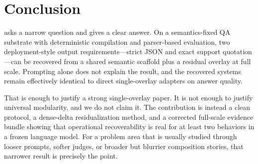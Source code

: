 
\section{Conclusion}

\method{} asks a narrow question and gives a clear answer. On a semantics-fixed QA substrate with deterministic compilation and parser-based evaluation, two deployment-style output requirements---strict JSON and exact support quotation---can be recovered from a shared semantic scaffold plus a residual overlay at full scale. Prompting alone does not explain the result, and the recovered systems remain effectively identical to direct single-overlay adapters on answer quality.

That is enough to justify a strong single-overlay paper. It is not enough to justify universal modularity, and we do not claim it. The contribution is instead a clean protocol, a dense-delta residualization method, and a corrected full-scale evidence bundle showing that operational recoverability is real for at least two behaviors in a frozen language model. For a problem area that is usually studied through looser prompts, softer judges, or broader but blurrier composition stories, that narrower result is precisely the point.
